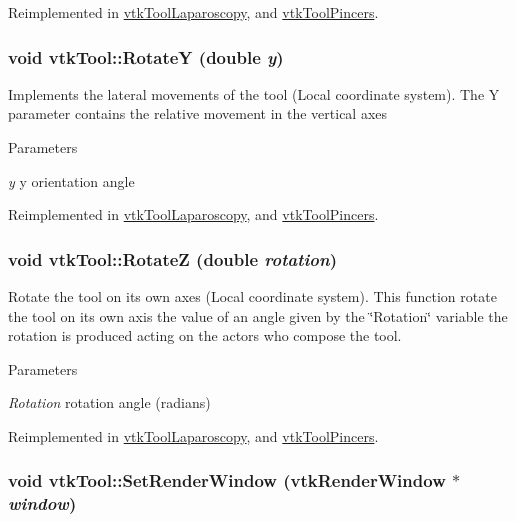 Reimplemented in \hyperlink{classvtkToolLaparoscopy_a6894dddee203102828358697e8214974}{vtkToolLaparoscopy}, and \hyperlink{classvtkToolPincers_ac6b80a0c7a43ae67cfafbe29772b41d0}{vtkToolPincers}.\hypertarget{classvtkTool_ad37e6208805e0fddd07dfc783a70fceb}{
\subsubsection[{RotateY}]{\setlength{\rightskip}{0pt plus 5cm}void vtkTool::RotateY (double {\em y})}}
\label{classvtkTool_ad37e6208805e0fddd07dfc783a70fceb}


Implements the lateral movements of the tool (Local coordinate system). The Y parameter contains the relative movement in the vertical axes 
\begin{DoxyParams}{Parameters}
\item[{\em y}]y orientation angle \end{DoxyParams}


Reimplemented in \hyperlink{classvtkToolLaparoscopy_ae0245eaa9aa765a675da5135c4af422a}{vtkToolLaparoscopy}, and \hyperlink{classvtkToolPincers_aa2a15405aa65c96dd971e3c06d98d197}{vtkToolPincers}.\hypertarget{classvtkTool_a80c0ca1937ce97c98d70364cac281ff2}{
\subsubsection[{RotateZ}]{\setlength{\rightskip}{0pt plus 5cm}void vtkTool::RotateZ (double {\em rotation})}}
\label{classvtkTool_a80c0ca1937ce97c98d70364cac281ff2}


Rotate the tool on its own axes (Local coordinate system). This function rotate the tool on its own axis the value of an angle given by the \char`\"{}Rotation\char`\"{} variable the rotation is produced acting on the actors who compose the tool. 
\begin{DoxyParams}{Parameters}
\item[{\em Rotation}]rotation angle (radians) \end{DoxyParams}


Reimplemented in \hyperlink{classvtkToolLaparoscopy_a3849ce4caa8283696433cb1ac0466bc5}{vtkToolLaparoscopy}, and \hyperlink{classvtkToolPincers_ad7a4a9f0e3291b88eb4e30986784539a}{vtkToolPincers}.\hypertarget{classvtkTool_a8f036524a724871dd5f7317e3000611c}{
\subsubsection[{SetRenderWindow}]{\setlength{\rightskip}{0pt plus 5cm}void vtkTool::SetRenderWindow (vtkRenderWindow $\ast$ {\em window})}}
\label{classvtkTool_a8f036524a724871dd5f7317e3000611c}


